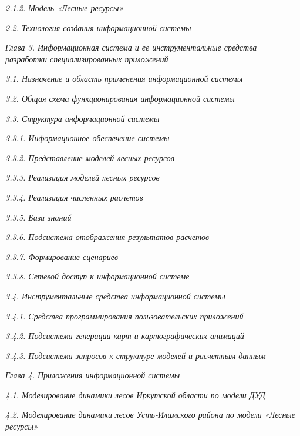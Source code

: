 \documentclass{article}
\begin{document}
\emph{2.1.2. Модель «Лесные ресурсы» \pageref{HToc199746722}}

\emph{2.2. Технология создания  информационной 
системы \pageref{HToc199746723}}

\emph{Глава 3. Информационная система и ее инструментальные 
средства разработки специализированных приложений \pageref{HToc199746724}}

\emph{3.1. Назначение и область применения информационной 
системы \pageref{HToc199746725}}

\emph{3.2. Общая схема функционирования информационной 
системы \pageref{HToc199746726}}

\emph{3.3. Структура информационной системы \pageref{HToc199746727}}

\emph{3.3.1. Информационное обеспечение системы \pageref{HToc199746728}}

\emph{3.3.2. Представление моделей лесных ресурсов \pageref{HToc199746729}}

\emph{3.3.3. Реализация моделей лесных ресурсов \pageref{HToc199746730}}

\emph{3.3.4. Реализация численных расчетов \pageref{HToc199746731}}

\emph{3.3.5. База знаний \pageref{HToc199746732}}

\emph{3.3.6. Подсистема отображения результатов 
расчетов \pageref{HToc199746733}}

\emph{3.3.7. Формирование сценариев \pageref{HToc199746734}}

\emph{3.3.8. Сетевой доступ к информационной системе \pageref{HToc199746735}}

\emph{3.4. Инструментальные средства информационной 
системы \pageref{HToc199746736}}

\emph{3.4.1. Средства программирования пользовательских 
приложений \pageref{HToc199746737}}

\emph{3.4.2. Подсистема генерации карт и картографических 
анимаций \pageref{HToc199746738}}

\emph{3.4.3. Подсистема запросов к структуре моделей 
и расчетным данным \pageref{HToc199746739}}

\emph{Глава 4. Приложения информационной системы \pageref{HToc199746740}}

\emph{4.1. Моделирование динамики лесов Иркутской 
области по модели ДУД \pageref{HToc199746741}}

\emph{4.2. Моделирование динамики лесов Усть-Илимского 
района по модели «Лесные ресурсы» \pageref{HToc199746742}}
\end{document}
